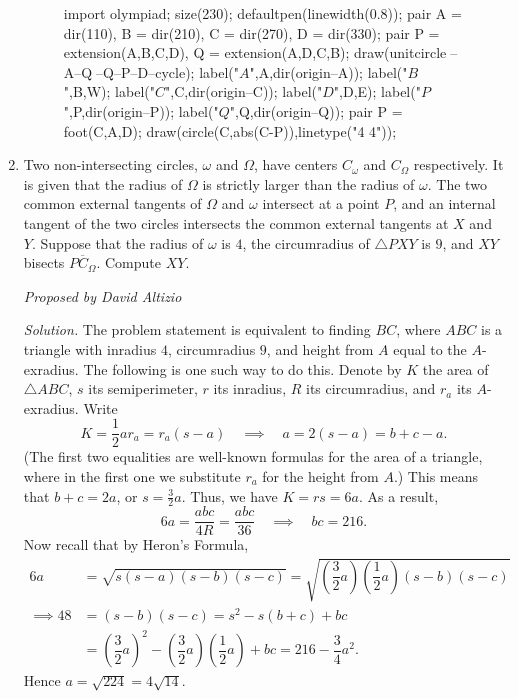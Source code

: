 \documentclass[10pt]{article}
\newcommand{\proposed}[1]
{
\vspace{5pt}
\noindent\textit{Proposed by #1}
}
\newcommand{\solution}
{
\vspace{5pt}
\noindent\textit{Solution.}\qquad
}
\begin{document}
\begin{enumerate}
\begin{figure}[ht]
	\centering
	\begin{asy}
	import olympiad;
	size(230);
	defaultpen(linewidth(0.8));
	pair A = dir(110), B = dir(210), C = dir(270), D = dir(330);
	pair P = extension(A,B,C,D), Q = extension(A,D,C,B);
	draw(unitcircle^^P--A--Q^^B--Q--P--D--cycle);
	label("$A$",A,dir(origin--A));
	label("$B$",B,W);
	label("$C$",C,dir(origin--C));
	label("$D$",D,E);
	label("$P$",P,dir(origin--P));
	label("$Q$",Q,dir(origin--Q));
	pair P = foot(C,A,D);
	draw(circle(C,abs(C-P)),linetype("4 4"));
\end{asy}
\end{figure}

\item Two non-intersecting circles, $\omega$ and $\Omega$, have centers $C_\omega$ and $C_\Omega$ respectively.  It is given that the radius of $\Omega$ is strictly larger than the radius of $\omega$.  The two common external tangents of $\Omega$ and $\omega$ intersect at a point $P$, and an internal tangent of the two circles intersects the common external tangents at $X$ and $Y$.  Suppose that the radius of $\omega$ is $4$, the circumradius of $\triangle PXY$ is $9$, and $XY$ bisects $\overline{PC_\Omega}$.  Compute $XY$.

\proposed{David Altizio}

\solution The problem statement is equivalent to finding $BC$, where $ABC$ is a triangle with inradius $4$, circumradius $9$, and height from $A$ equal to the $A$-exradius.  The following is one such way to do this.  Denote by $K$ the area of $\triangle ABC$, $s$ its semiperimeter, $r$ its inradius, $R$ its circumradius, and $r_a$ its $A$-exradius.  Write \[K = \dfrac12ar_a = r_a(s-a)\quad\implies\quad a = 2(s-a) = b+c-a.\] (The first two equalities are well-known formulas for the area of a triangle, where in the first one we substitute $r_a$ for the height from $A$.) This means that $b+c=2a$, or $s=\tfrac32a$.  Thus, we have $K=rs=6a$.  As a result, \[6a = \dfrac{abc}{4R} = \dfrac{abc}{36}\quad\implies\quad bc = 216.\] Now recall that by Heron's Formula, \begin{align*}6a &= \sqrt{s(s-a)(s-b)(s-c)} = \sqrt{\left(\dfrac32a\right)\left(\dfrac12a\right)(s-b)(s-c)}\\\implies 48 &= (s-b)(s-c)=s^2-s(b+c)+bc\\&=\left(\dfrac32a\right)^2 - \left(\dfrac32a\right)\left(\dfrac12a\right) + bc= 216-\dfrac34a^2.\end{align*} Hence $a = \sqrt{224} = \boxed{4\sqrt{14}}$.


\end{enumerate}
\end{document}
